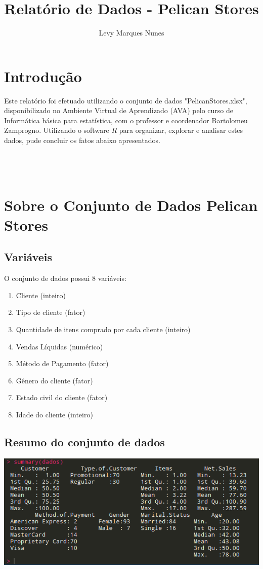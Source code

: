 \documentclass[a4paper,12pt]{article}
\title{Relatório de Dados - Pelican Stores}
\author{Levy Marques Nunes}
\begin{document}
\maketitle

\section{Introdução}

Este relatório foi efetuado utilizando o conjunto de dados "PelicanStores.xlsx", disponibilizado no Ambiente Virtual de Aprendizado (AVA) pelo curso de Informática básica para estatística, com o professor e coordenador Bartolomeu Zamprogno. Utilizando o software $R$ para organizar, explorar e analisar estes dados, pude concluir os fatos abaixo apresentados.
\\
\\
\\
\\

\section{Sobre o Conjunto de Dados Pelican Stores}

\subsection{Variáveis}

O conjunto de dados possui 8 variáveis:
\begin{enumerate}
\item Cliente (inteiro)
\item Tipo de cliente (fator)
\item Quantidade de itens comprado por cada cliente (inteiro)
\item Vendas Líquidas (numérico)
\item Método de Pagamento (fator)
\item Gênero do cliente (fator)
\item Estado civil do cliente (fator)
\item Idade do cliente (inteiro)
\end{enumerate}

\subsection{Resumo do conjunto de dados}
\includegraphics{resumo.png} \\
\end{document}
